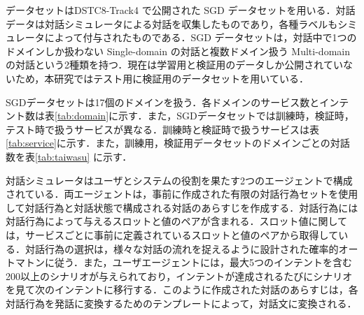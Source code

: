 データセットはDSTC8-Track4 で公開された SGD データセット\cite{sgd}を用いる．対話データは対話シミュレータによる対話を収集したものであり，各種ラベルもシミュレータによって付与されたものである．SGD データセットは，対話中で1つのドメインしか扱わない Single-domain の対話と複数ドメイン扱う Multi-domain の対話という2種類を持つ．現在は学習用と検証用のデータしか公開されていないため，本研究ではテスト用に検証用のデータセットを用いている．
\par
SGDデータセットは17個のドメインを扱う．各ドメインのサービス数とインテント数は表\ref{tab:domain}に示す．また，SGDデータセットでは訓練時，検証時，テスト時で扱うサービスが異なる．訓練時と検証時で扱うサービスは表\ref{tab:service}に示す．また，訓練用，検証用データセットのドメインごとの対話数を表\ref{tab:taiwasu} に示す．

対話シミュレータはユーザとシステムの役割を果たす2つのエージェントで構成されている．両エージェントは，事前に作成された有限の対話行為セットを使用して対話行為と対話状態で構成される対話のあらすじを作成する．対話行為には対話行為によって与えるスロットと値のペアが含まれる．スロット値に関しては，サービスごとに事前に定義されているスロットと値のペアから取得している．対話行為の選択は，様々な対話の流れを捉えるように設計された確率的オートマトンに従う．また，ユーザエージェントには，最大5つのインテントを含む200以上のシナリオが与えられており，インテントが達成されるたびにシナリオを見て次のインテントに移行する．このように作成された対話のあらすじは，各対話行為を発話に変換するためのテンプレートによって，対話文に変換される．